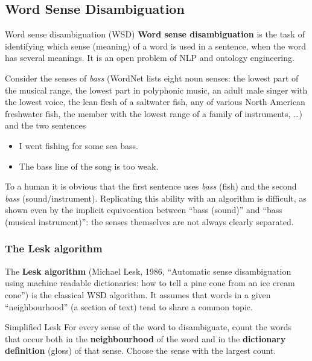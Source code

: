 \subsection{Word Sense Disambiguation}
\label{sec:word-sense-disambiguation}

\begin{nbdef}{Word sense disambiguation (WSD)}
\textbf{Word sense disambiguation} is the task of identifying which sense (meaning) of a
word is used in a sentence, when the word has several meanings. It is an open problem of
NLP and ontology engineering.
\end{nbdef}

Consider the senses of \emph{bass} (WordNet lists eight noun senses: the lowest part of
the musical range, the lowest part in polyphonic music, an adult male singer with the
lowest voice, the lean flesh of a saltwater fish, any of various North American
freshwater fish, the member with the lowest range of a family of instruments, \ldots) and
the two sentences
\begin{itemize}[nosep]
  \item I went fishing for some sea bass.
  \item The bass line of the song is too weak.
\end{itemize}
To a human it is obvious that the first sentence uses \emph{bass} (fish) and the second
\emph{bass} (sound/instrument). Replicating this ability with an algorithm is difficult,
as shown even by the implicit equivocation between ``bass (sound)'' and ``bass (musical
instrument)'': the senses themselves are not always clearly separated.

\subsubsection{The Lesk algorithm}

The \textbf{Lesk algorithm} (Michael Lesk, 1986, ``Automatic sense disambiguation using
machine readable dictionaries: how to tell a pine cone from an ice cream cone'') is the
classical WSD algorithm. It assumes that words in a given ``neighbourhood'' (a section of
text) tend to share a common topic.

\begin{nbdef}{Simplified Lesk}
For every sense of the word to disambiguate, count the words that occur both in the
\textbf{neighbourhood} of the word and in the \textbf{dictionary definition} (gloss) of
that sense. Choose the sense with the largest count.
\end{nbdef}

